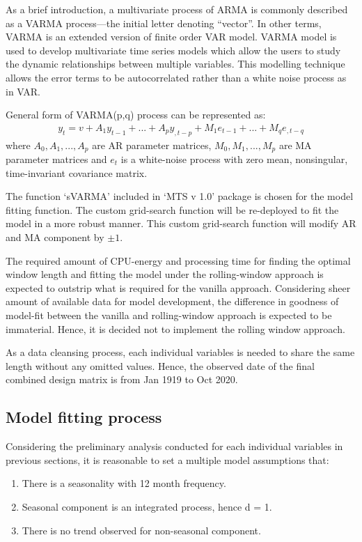 \documentclass[
  11pt,
]{article}
\providecommand{\tightlist}{%
  \setlength{\itemsep}{0pt}\setlength{\parskip}{0pt}}
\begin{document}
As a brief introduction, a multivariate process of ARMA is commonly
described as a VARMA process---the initial letter denoting ``vector''.
In other terms, VARMA is an extended version of finite order VAR model.
VARMA model is used to develop multivariate time series models which
allow the users to study the dynamic relationships between multiple
variables. This modelling technique allows the error terms to be
autocorrelated rather than a white noise process as in VAR.

General form of VARMA(p,q) process can be represented as: \begin{align}
  y_{t} = v+A_{1}y_{t-1}+...+A_{p}y_{,t-p}+M_{1}e_{t-1}+...+M_{q}e_{,t-q}
\end{align} where \(A_0, A_1, ..., A_p\) are AR parameter matrices,
\(M_0, M_1, ..., M_p\) are MA parameter matrices and \(e_t\) is a
white-noise process with zero mean, nonsingular, time-invariant
covariance matrix.

The function `sVARMA' included in `MTS v 1.0' package is chosen for the
model fitting function. The custom grid-search function will be
re-deployed to fit the model in a more robust manner. This custom
grid-search function will modify AR and MA component by \(\pm1\).

The required amount of CPU-energy and processing time for finding the
optimal window length and fitting the model under the rolling-window
approach is expected to outstrip what is required for the vanilla
approach. Considering sheer amount of available data for model
development, the difference in goodness of model-fit between the vanilla
and rolling-window approach is expected to be immaterial. Hence, it is
decided not to implement the rolling window approach.

As a data cleansing process, each individual variables is needed to
share the same length without any omitted values. Hence, the observed
date of the final combined design matrix is from Jan 1919 to Oct 2020.

\hypertarget{model-fitting-process}{%
\subsection{Model fitting process}\label{model-fitting-process}}

Considering the preliminary analysis conducted for each individual
variables in previous sections, it is reasonable to set a multiple model
assumptions that:

\begin{enumerate}
\def\labelenumi{\arabic{enumi}.}
\tightlist
\item
  There is a seasonality with 12 month frequency.
\item
  Seasonal component is an integrated process, hence d = 1.
\item
  There is no trend observed for non-seasonal component.
\end{enumerate}
\end{document}
